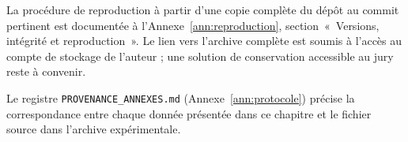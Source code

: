 La procédure de reproduction à partir d'une copie complète du dépôt au commit pertinent
est documentée à l'Annexe~\ref{ann:reproduction}, section~«~Versions, intégrité et reproduction~». Le lien vers l'archive complète est soumis à l'accès au compte de stockage
de l'auteur ; une solution de conservation accessible au jury reste à convenir.

Le registre \texttt{PROVENANCE\_ANNEXES.md} (Annexe~\ref{ann:protocole}) précise la
correspondance entre chaque donnée présentée dans ce chapitre et le fichier source dans
l'archive expérimentale.
